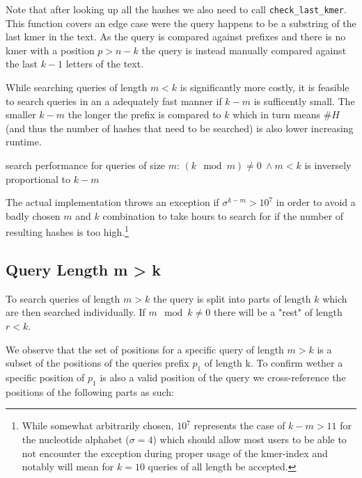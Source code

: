 Note that after looking up all the hashes we also need to call \lstinline{check_last_kmer}. This function covers an
edge case were the query happens to be a substring of the last kmer in the text. As the query is compared
against prefixes and there is no kmer with a position $p>n-k$ the query is instead
manually compared against the last $k-1$ letters of the text.

While searching queries of length $m<k$ is significantly more costly, it is feasible to search queries in an a
adequately fast manner if $k-m$ is sufficently small. The smaller $k-m$ the longer the prefix is compared to $k$ which
in turn means $\#H$ (and thus the number of hashes that need to be searched) is also lower increasing runtime.

\begin{lem}
\label{Lemma 2}
search performance for queries of size $m:\,(k\mod m)\neq0\:\land m<k$ is inversely proportional to $k-m$
\end{lem}

The actual implementation throws an exception if $\sigma^{k-m}>10^{7}$ in order to avoid a badly chosen $m$ and $k$
combination to take hours to search for if the number of resulting hashes is too high.\footnote{While somewhat arbitrarily
chosen, $10^{7}$ represents the case of $k-m>11$ for the nucleotide alphabet ($\sigma=4$) which should allow most users
to be able to not encounter the exception during proper usage of the kmer-index and notably will mean for $k=10$ queries
of all length be accepted.}

\subsection{Query Length m > k}

To search queries of length $m>k$ the query is split into parts of length $k$ which are then searched individually.
If $m\mod k\neq0$ there will be a "rest" of length $r<k$.

We observe that the set of positions for a specific query of length $m>k$ is a subset of the positions of the queries
prefix $p_{1}$ of length k. To confirm wether a specific position of $p_{1}$ is also a valid position of the query we
cross-reference the positions of the following parts as such:

